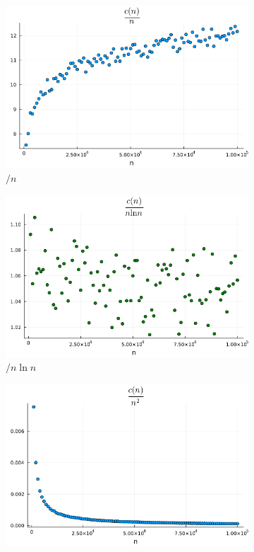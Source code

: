 \documentclass{article}
\begin{document}
\begin{figure}[h]
    \centering
    \begin{subfigure}{0.32\textwidth}
        \centering
        \includegraphics[width=1.0\textwidth]{../results/c(n)_1.png}
        \caption{$/ n$}
    \end{subfigure}
    \begin{subfigure}{0.32\textwidth}
        \centering
        \includegraphics[width=1.0\textwidth]{../results/c(n)_2.png}
        \caption{$/ n \ln n$}
    \end{subfigure}
    \begin{subfigure}{0.32\textwidth}
        \centering
        \includegraphics[width=1.0\textwidth]{../results/c(n)_3.png}

\end{subfigure}
\end{figure}
\end{document}
